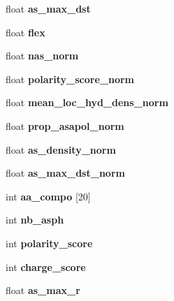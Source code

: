 \begin{CompactItemize}
\item 
\hypertarget{structs__desc_6620d6b2cdaaa469b32a66a5e5260a80}{
float \textbf{as\_\-max\_\-dst}}
\label{structs__desc_6620d6b2cdaaa469b32a66a5e5260a80}

\item 
\hypertarget{structs__desc_537c647e77f9ca129c77b31e3d15b2ca}{
float \textbf{flex}}
\label{structs__desc_537c647e77f9ca129c77b31e3d15b2ca}

\item 
\hypertarget{structs__desc_8c4599be9319ff05ecf42dd6c70d0d6d}{
float \textbf{nas\_\-norm}}
\label{structs__desc_8c4599be9319ff05ecf42dd6c70d0d6d}

\item 
\hypertarget{structs__desc_15f213905d46949ade4dc9ec9e413d4f}{
float \textbf{polarity\_\-score\_\-norm}}
\label{structs__desc_15f213905d46949ade4dc9ec9e413d4f}

\item 
\hypertarget{structs__desc_3a111a68d68713a0c9b2d5e904951820}{
float \textbf{mean\_\-loc\_\-hyd\_\-dens\_\-norm}}
\label{structs__desc_3a111a68d68713a0c9b2d5e904951820}

\item 
\hypertarget{structs__desc_a18101e18ed5d1714470a026621037f3}{
float \textbf{prop\_\-asapol\_\-norm}}
\label{structs__desc_a18101e18ed5d1714470a026621037f3}

\item 
\hypertarget{structs__desc_a97dfcc5ad6152e55ef0ebe9985cce5c}{
float \textbf{as\_\-density\_\-norm}}
\label{structs__desc_a97dfcc5ad6152e55ef0ebe9985cce5c}

\item 
\hypertarget{structs__desc_9a9c0a666cb104843a278525e556087a}{
float \textbf{as\_\-max\_\-dst\_\-norm}}
\label{structs__desc_9a9c0a666cb104843a278525e556087a}

\item 
\hypertarget{structs__desc_12f239c0748ce08dba80fac61722117f}{
int \textbf{aa\_\-compo} \mbox{[}20\mbox{]}}
\label{structs__desc_12f239c0748ce08dba80fac61722117f}

\item 
\hypertarget{structs__desc_d481d25ff964a6858975b5abfb671412}{
int \textbf{nb\_\-asph}}
\label{structs__desc_d481d25ff964a6858975b5abfb671412}

\item 
\hypertarget{structs__desc_d612b029bba06646381771d4b61dc5e6}{
int \textbf{polarity\_\-score}}
\label{structs__desc_d612b029bba06646381771d4b61dc5e6}

\item 
\hypertarget{structs__desc_00da80b684d1bb1af13ec779e282c7e0}{
int \textbf{charge\_\-score}}
\label{structs__desc_00da80b684d1bb1af13ec779e282c7e0}

\item 
\hypertarget{structs__desc_eb15aebab64687c1c18d261e40b96901}{
float \textbf{as\_\-max\_\-r}}
\label{structs__desc_eb15aebab64687c1c18d261e40b96901}

\end{CompactItemize}


